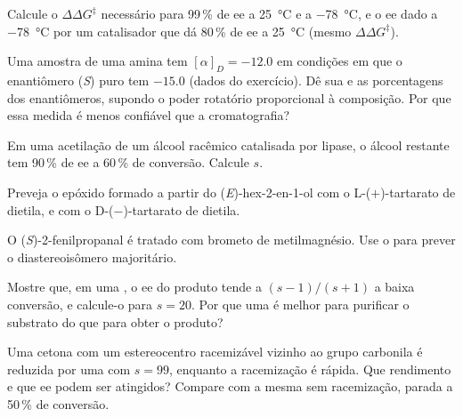 \begin{exercise}[$\star\star$]\label{exo:b3:asymmetric-synthesis:5}
Calcule o $\Delta\Delta G^\ddagger$ necessário para 99\,\% de ee a \qty{25}{\celsius} e a \qty{-78}{\celsius}, e o ee dado a \qty{-78}{\celsius}
por um catalisador que dá 80\,\% de ee a \qty{25}{\celsius} (mesmo $\Delta\Delta G^\ddagger$).
\end{exercise}

\begin{exercise}[$\star\star$]\label{exo:b3:asymmetric-synthesis:6}
Uma amostra de uma amina tem $[\alpha]_D = -12.0$ em condições em que o enantiômero (\textit{S}) puro
tem $-15.0$ (dados do exercício). Dê sua  e as
porcentagens dos enantiômeros, supondo o poder rotatório proporcional à composição.
Por que essa medida é menos confiável que a cromatografia?
\end{exercise}

\begin{exercise}[$\star\star$]\label{exo:b3:asymmetric-synthesis:7}
Em uma acetilação de um álcool racêmico catalisada por lipase, o álcool restante
tem 90\,\% de ee a 60\,\% de conversão. Calcule $s$.
\end{exercise}

\begin{exercise}[$\star\star$]\label{exo:b3:asymmetric-synthesis:8}
Preveja o epóxido formado a partir do (\textit{E})-hex-2-en-1-ol com o L-($+$)-tartarato de dietila, e com o
D-($-$)-tartarato de dietila.
\end{exercise}

\begin{exercise}[$\star\star$]\label{exo:b3:asymmetric-synthesis:9}
O (\textit{S})-2-fenilpropanal é tratado com brometo de metilmagnésio. Use o 
para prever o diastereoisômero majoritário.
\end{exercise}

\begin{exercise}[$\star\star\star$]\label{exo:b3:asymmetric-synthesis:10}
Mostre que, em uma , o ee do produto tende a $(s - 1)/(s + 1)$ a baixa
conversão, e calcule-o para $s = 20$. Por que uma  é melhor para purificar
o substrato do que para obter o produto?
\end{exercise}

\begin{exercise}[$\star\star\star$]\label{exo:b3:asymmetric-synthesis:11}
Uma cetona com um estereocentro racemizável vizinho ao grupo carbonila é reduzida por
uma  com $s = 99$, enquanto a racemização é rápida. Que rendimento e que ee podem ser
atingidos? Compare com a mesma  sem racemização, parada a 50\,\% de
conversão.
\end{exercise}

